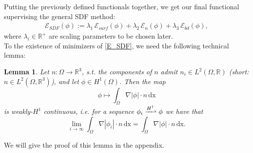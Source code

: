 \documentclass[12pt,openany]{book}
\newcommand{\R}{\mathbb{R}}
\theoremstyle{plainnormal}
\newtheorem{lemma}[theorem]{Lemma}
\theoremstyle{remark}
\begin{document}
Putting the previously defined functionals together, we get our final functional supervising the general SDF method:
\begin{align}\label{E_SDF}
    \mathcal{E}_{SDF}(\phi) := \lambda_1\,\mathcal{E}_{surf} (\phi)+ \lambda_2\,\mathcal{E}_{n}(\phi) + \lambda_3\,\mathcal{E}_{bd}(\phi),
\end{align}
where $\lambda_i\in\R^+$ are scaling parameters to be chosen later.\\
To the existence of minimizers of \eqref{E_SDF}, we need the following technical lemma: 
\begin{lemma}\label{technicalLemma}
    Let $n: \Omega \rightarrow \R^3$, s.t. the components of $n$ admit  $n_i\in L^2(\Omega, \R)$ (short: $n\in L^2(\Omega, \R^3)$), and let $\phi\in H^1(\Omega)$. Then the map $$\phi \mapsto \int_\Omega \nabla |\phi|\cdot n \,\mathrm{dx}$$ is weakly-$H^1$ continuous, i.e. for a sequence $\phi_i \xrightharpoonup{H^1}\phi$ we have that $$\lim_{i\rightarrow\infty}\int_\Omega \nabla|\phi_i|\cdot n  \,\mathrm{dx} = \int_\Omega \nabla|\phi|\cdot n\,\mathrm{dx}.$$
\end{lemma}
We will give the proof of this lemma in the appendix.
\end{document}
